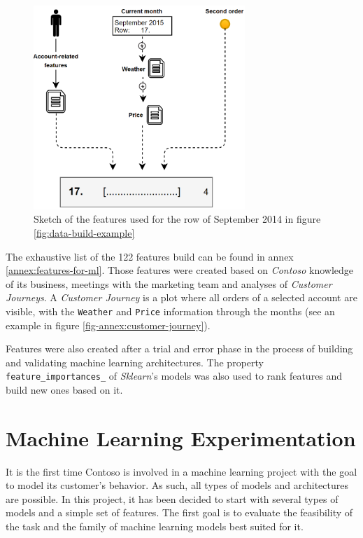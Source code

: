 \begin{figure}[h]
    \centering
    \includegraphics[width=8cm]{images/data-build-ml-example-row.png}
    \caption[Features building for specific month]{Sketch of the features used for the row of September 2014 in figure \ref{fig:data-build-example}}
    \label{fig:data-build-row-example}
\end{figure}

The exhaustive list of the 122 features build can be found in annex \ref{annex:features-for-ml}. Those features were created based on \textit{Contoso} knowledge of its business, meetings with the marketing team and analyses of \textit{Customer Journeys}. A \textit{Customer Journey} is a plot where all orders of a selected account are visible, with the \texttt{Weather} and \texttt{Price} information through the months (see an example in figure \ref{fig-annex:customer-journey}). 

Features were also created after a trial and error phase in the process of building and validating machine learning architectures. The property \texttt{feature\_importances\_} of \textit{Sklearn}'s models was also used to rank features and build new ones based on it.



\section{Machine Learning Experimentation} \label{sec:ml-experimentation}

It is the first time Contoso is involved in a machine learning project with the goal to model its customer's behavior. As such, all types of models and architectures are possible. In this project, it has been decided to start with several types of models and a simple set of features. The first goal is to evaluate the feasibility of the task and the family of machine learning models best suited for it. 


